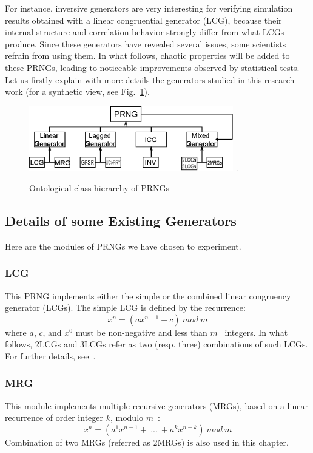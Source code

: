 For instance, inversive generators are very interesting for verifying simulation results obtained with a linear congruential generator (LCG),
because their internal structure and correlation behavior strongly differ from what LCGs produce.
Since these generators have revealed several issues, some scientists refrain from using them.
In what follows, chaotic properties will be added to these PRNGs, leading to noticeable improvements observed by statistical tests.
Let us firstly explain with more details the generators studied in this research work (for a synthetic view, see Fig.~\ref{Ontological class hierarchy of RNGs}).

\begin{figure}
\centering
\includegraphics[width=3.5in]{TYPEPRNG.eps}
\DeclareGraphicsExtensions.
\caption{Ontological class hierarchy of PRNGs}
\label{Ontological class hierarchy of RNGs}
\end{figure}

\subsection{Details of some Existing Generators}

Here are the modules of PRNGs we have chosen to experiment.

\subsubsection{LCG}
This PRNG implements either the simple or the combined linear congruency generator (LCGs). The simple LCG is defined by the recurrence:
\begin{equation}
x^n = (ax^{n-1} + c)~mod~m
\label{LCG}
\end{equation}
where $a$, $c$, and $x^0$ must be non-negative and less than $m$~\cite{Lecuyer2009} integers. In what follows, 2LCGs and 3LCGs refer as two (resp. three) combinations of such LCGs.
For further details, see~\cite{combined_lcg}.

\subsubsection{MRG}
This module implements multiple recursive generators (MRGs), based on a linear recurrence of order integer $k$, modulo $m$~\cite{Lecuyer2009}:
\begin{equation}
x^n = (a^1x^{n-1}+~...~+a^kx^{n-k})~mod~m
\label{MRG}
\end{equation}
Combination of two MRGs (referred as 2MRGs) is also used in this chapter.

